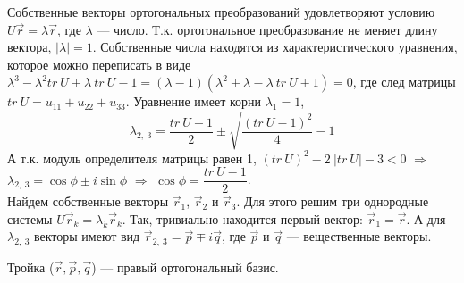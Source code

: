 Собственные векторы ортогональных преобразований удовлетворяют условию $U\vec{r} = \lambda\vec{r}$, где $\lambda$ --- число. Т.к. ортогональное преобразование не меняет длину вектора, $|\lambda| = 1$. Собственные числа находятся из характеристического уравнения, которое можно переписать в виде $\lambda^3 - \lambda^2tr~U + \lambda ~tr~U - 1 = (\lambda - 1)(\lambda^2 + \lambda - \lambda~tr~U + 1) = 0$, где след матрицы $tr~U = u_{11} + u_{22} + u_{33}$. Уравнение имеет корни $\lambda_1 = 1$, 
\[
\lambda_{2,~3} = \dfrac{tr~U - 1}{2} \pm \sqrt{\dfrac{(tr~U - 1)^2}{4} - 1}
\]
А т.к. модуль определителя матрицы равен 1, $(tr~U)^2 - 2~|tr~U| - 3 < 0 $ $\Longrightarrow$ $\lambda_{2,~3} = \cos{\phi} \pm i\sin{\phi}$ $\Longrightarrow$ $\cos{\phi} = \dfrac{tr~U - 1}{2}$.\\
Найдем собственные векторы $\vec{r}_1$, $\vec{r}_2$ и $\vec{r}_3$. Для этого решим три однородные системы $U\vec{r}_k = \lambda_k\vec{r}_k$. Так, тривиально находится первый вектор: $\vec{r}_1 = \vec{r}$. А для $\lambda_{2,~3}$ векторы имеют вид $\vec{r}_{2,~3} = \vec{p} \mp i\vec{q}$, где $\vec{p}$ и $\vec{q}$ --- вещественные векторы.
\begin{lemma}
    Тройка ($\vec{r}, \vec{p}, \vec{q}$) --- правый ортогональный базис.
\end{lemma}

